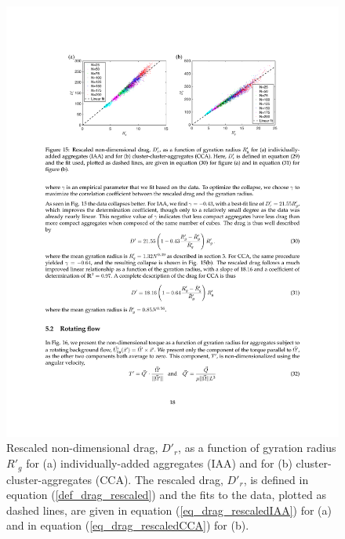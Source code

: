 \begin{figure}[ht]
	\begin{center}
		\includegraphics[scale = 1.0]{./figures/fig_drag_all_rescaledprime.pdf}
	\end{center}
	\caption{Rescaled non-dimensional drag, $D'_r$, as a function of gyration radius $R'_g$ for (a) individually-added aggregates (IAA) and for (b)  
	cluster-cluster-aggregates (CCA). The rescaled drag, $D'_r$, is defined in equation (\ref{def_drag_rescaled})  and the fits to the data, plotted as dashed lines, are given in equation (\ref{eq_drag_rescaledIAA}) for (a) and in equation (\ref{eq_drag_rescaledCCA}) for (b).}
	\label{fig_drag_rescaled}
\end{figure}

